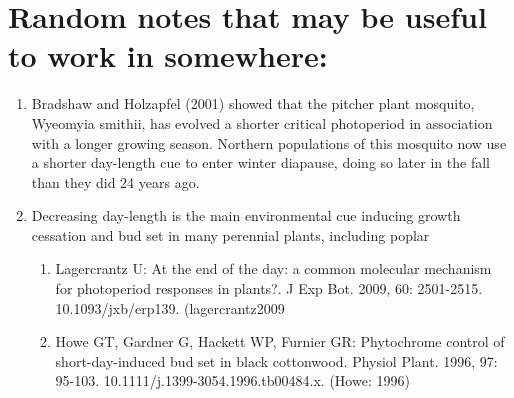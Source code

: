 \documentclass{article}
\begin{document}
\section* {Random notes that may be useful to work in somewhere:}
\begin {enumerate}
\item Bradshaw and Holzapfel (2001) showed that the pitcher plant mosquito,
Wyeomyia smithii, has evolved a shorter critical photoperiod in association with a
longer growing season. Northern populations of this mosquito now use a shorter
day-length cue to enter winter diapause, doing so later in the fall than they did
24 years ago.
\item Decreasing day-length is the main environmental cue inducing growth cessation and bud set in many perennial plants, including poplar 
\begin{enumerate}

\item Lagercrantz U: At the end of the day: a common molecular mechanism for photoperiod responses in plants?. J Exp Bot. 2009, 60: 2501-2515. 10.1093/jxb/erp139. (lagercrantz2009
\item Howe GT, Gardner G, Hackett WP, Furnier GR: Phytochrome control of short-day-induced bud set in black cottonwood. Physiol Plant. 1996, 97: 95-103. 10.1111/j.1399-3054.1996.tb00484.x. (Howe: 1996)
\end{enumerate}


\end {enumerate}

\clearpage
\end{document}
